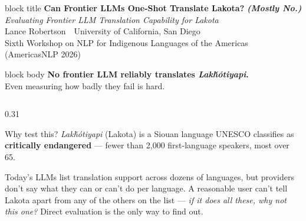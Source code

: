 \documentclass[final]{beamer}
\newcommand{\lak}[1]{\textit{#1}}
\begin{document}
\begin{frame}[t]

\begin{beamercolorbox}[wd=\paperwidth,sep=26pt]{block title}
\centering
{\headfont\bfseries\fontsize{80}{94}\selectfont Can Frontier LLMs One-Shot Translate Lakota?\,\,{\itshape\color{warmlight}(Mostly No.)}}\\[12pt]
{\headfont\itshape\fontsize{34}{42}\selectfont Evaluating Frontier LLM Translation Capability for Lakota}\\[14pt]
{\headfont\fontsize{30}{36}\selectfont Lance Robertson\, \textperiodcentered\, University of California, San Diego}\\[4pt]
{\fontsize{24}{30}\selectfont Sixth Workshop on NLP for Indigenous Languages of the Americas (AmericasNLP 2026)}
\end{beamercolorbox}

\vspace{14pt}

\begin{beamercolorbox}[wd=\paperwidth,sep=24pt]{block body}
\centering
{\fontsize{64}{92}\selectfont\headfont\bfseries No frontier LLM reliably translates {\normalfont\rmfamily\bfseries\itshape\color{accent}\fontsize{82}{92}\selectfont Lakȟótiyapi}.}\\[14pt]
{\headfont\fontsize{40}{50}\selectfont Even measuring how badly they fail is hard.}
\end{beamercolorbox}

\vspace{20pt}

\begin{columns}[t]

\begin{column}{0.31\paperwidth}

\begin{block}{Why test this?}
\lak{Lakȟótiyapi} (Lakota) is a Siouan language UNESCO classifies as \textbf{critically endangered} --- fewer than 2,000 first-language speakers, most over 65.
\medskip

Today's LLMs list translation support across dozens of languages, but providers don't say what they can or can't do per language. A reasonable user can't tell Lakota apart from any of the others on the list --- \emph{if it does all these, why not this one?} Direct evaluation is the only way to find out.
\end{block}


\end{column}
\end{columns}
\end{frame}
\end{document}
